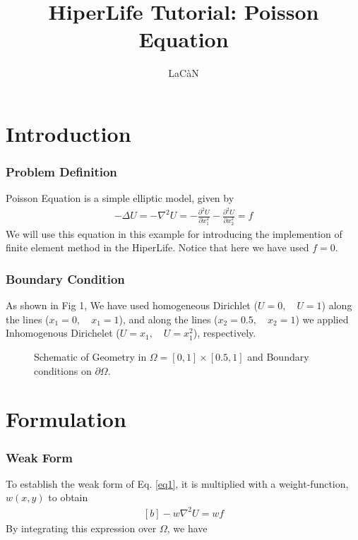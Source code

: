 \documentclass[]{article}
\begin{document}
\title{HiperLife Tutorial: Poisson Equation}
\author{LaCàN}
\maketitle

\linenumbers
\section{Introduction} \label{sec: Int}
\subsubsection{Problem Definition} \label{sec: pd} 
Poisson Equation is a simple elliptic model, given by
\begin{equation}\label{eq1}
	\begin{aligned}
		 -\Delta U = -\nabla^2 U = -\frac{\partial^2 U}{\partial x_{1}^2} - 
		\frac{\partial^2 U}{\partial x_{2}^2}=f
	\end{aligned}
\end{equation}
We will use this equation in this example for introducing the implemention of finite
element method in the HiperLife. Notice that here we have used $f = 0$.
\subsubsection{Boundary Condition} \label{sec: B.C}
As shown in Fig 1, We have used homogeneous Dirichlet ($U=0 ,\quad U=1$) along the lines ($x_{1}=0,\quad x_{1}=1$), and along the lines ($x_{2}=0.5,\quad x_{2}=1$) we applied Inhomogenous Dirichelet ($U=x_{1} ,\quad U=x_{1}^2$), respectively.

\begin{figure}[htbp]
	\centering
	
	\caption{Schematic of Geometry in $\Omega =[0,1]\times[0.5,1]$ and Boundary conditions on $\partial \Omega$.}
	\label{fig_SB}
\end{figure}

\section{Formulation} \label{sec: frml}
\subsubsection{Weak Form} \label{sec: WF}
To establish the weak form of Eq. \ref{eq1}, it is multiplied with a weight-function, $w(x, y)$ to obtain
\begin{equation}\label{eq2}
	\begin{aligned}[b]
		-w\nabla^2 U = wf
	\end{aligned}
\end{equation}
By integrating this expression over $\Omega$, we have
\end{document}

